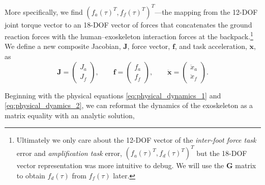 \documentclass[utf8]{frontiersSCNS}
\begin{document}
More specifically, we find $(f_a(\tau)^T, f_f(\tau)^T)^T$---the mapping from the 12-DOF joint torque vector to an 18-DOF vector of forces that concatenates the ground reaction forces with the human--exoskeleton interaction forces at the backpack.\footnote{Ultimately we only care about the 12-DOF vector of the \emph{inter-foot force task} error and \emph{amplification task} error, $(f_a(\tau)^T, f_d(\tau)^T)^T$ but the 18-DOF vector representation was more intuitive to debug. We will use the $\mathbf{G}$ matrix to obtain $f_d(\tau)$ from $f_f(\tau)$ later.}
We define a new composite Jacobian, $\mathbf J$, force vector, $\mathbf f$, and task acceleration, $\ddot{\mathbf x}$, as
\begin{equation}
\mathbf{J} = \begin{pmatrix} J_a\\J_f\end{pmatrix},
\qquad \mathbf{f} = \begin{pmatrix} f_a\\f_f\end{pmatrix},
\qquad \ddot{\mathbf{x}} = \begin{pmatrix} \ddot{x}_a\\\ddot{x}_f\end{pmatrix}. \label{eq:bigJdef}
\end{equation}


Beginning with the physical equations  \eqref{eq:physical_dynamics_1} and \eqref{eq:physical_dyamics_2}, we can reformat the dynamics of the exoskeleton as a matrix equality with an analytic solution, 
\end{document}
